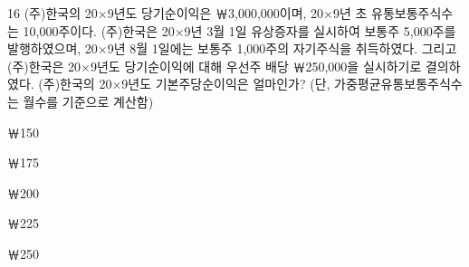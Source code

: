 \begin{question}{16}
(주)한국의 20×9년도 당기순이익은 ￦3,000,000이며, 20×9년 초 유통보통주식수는 10,000주이다. (주)한국은 20×9년 3월 1일 유상증자를 실시하여 보통주 5,000주를 발행하였으며, 20×9년 8월 1일에는 보통주 1,000주의 자기주식을 취득하였다. 그리고 (주)한국은 20×9년도 당기순이익에 대해 우선주 배당 ￦250,000을 실시하기로 결의하였다. (주)한국의 20×9년도 기본주당순이익은 얼마인가? (단, 가중평균유통보통주식수는 월수를 기준으로 계산함)
\begin{choices}
  \item ￦150
  \item ￦175
  \item ￦200
  \item ￦225
  \item ￦250
\end{choices}
\end{question}
